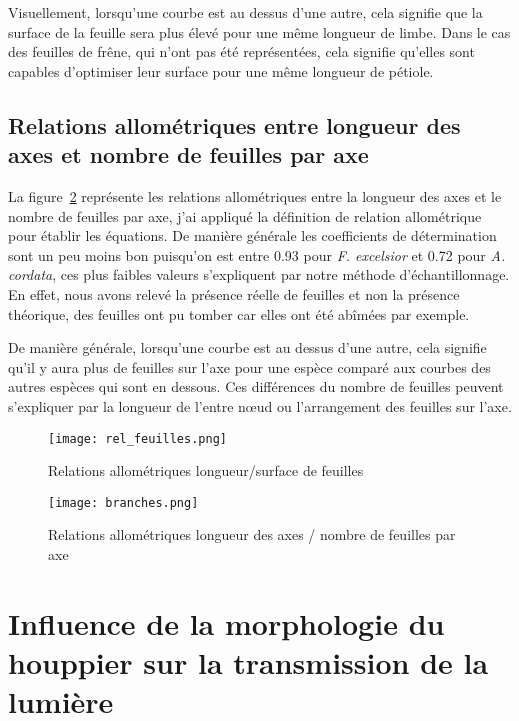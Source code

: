 \documentclass[12pt]{report}
\begin{document}
Visuellement, lorsqu'une courbe est au dessus d'une autre, cela signifie que la
surface de la feuille sera plus élevé pour une même longueur de limbe. Dans le
cas des feuilles de frêne, qui n'ont pas été représentées, cela signifie
qu'elles sont capables d'optimiser leur surface pour une même longueur de
pétiole.

\subsection{Relations allométriques entre longueur des axes et nombre de
feuilles par axe}


La figure~\ref{fig:branches} représente les relations allométriques 
entre la longueur des axes et le nombre de feuilles par axe, j'ai appliqué la
définition de relation allométrique pour établir les
équations. De manière générale les coefficients de détermination sont un peu
moins bon puisqu'on est entre 0.93 pour \textit{F. excelsior} et 0.72 pour
\textit{A. cordata}, ces plus faibles valeurs s'expliquent par notre méthode
d'échantillonnage. En effet, nous avons relevé la présence réelle de feuilles et
non la présence théorique, des feuilles ont pu tomber car elles ont été abîmées
par exemple.

De manière générale, lorsqu'une courbe est au dessus d'une autre, cela signifie
qu'il y aura plus de feuilles sur l'axe pour une
espèce comparé aux courbes des autres espèces qui sont en dessous. Ces
différences du nombre de feuilles peuvent s'expliquer par la longueur de l'entre
n\oe{}ud ou l'arrangement des feuilles sur l'axe.

\begin{figure}[!ht]
    \centering
    \texttt{[image: rel\_feuilles.png]}
    \caption{Relations allométriques longueur/surface de feuilles\label{fig:feuilles}}
\end{figure}
\begin{figure}[!hb]
    \centering
    \texttt{[image: branches.png]}
    \caption{Relations allométriques longueur des axes / nombre de feuilles par axe\label{fig:branches}}
\end{figure}

\section{Influence de la morphologie du houppier sur la transmission de la lumière}
\end{document}
